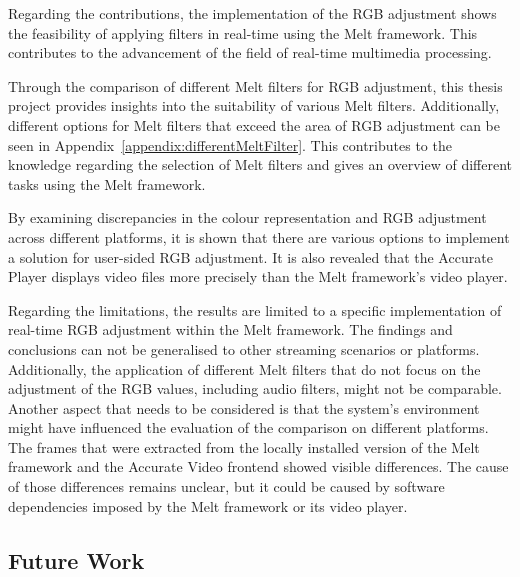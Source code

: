 \documentclass[../MasterThesis.tex]{subfiles}
\begin{document}
Regarding the contributions, the implementation of the RGB adjustment shows the feasibility of applying filters in real-time using the Melt framework.
This contributes to the advancement of the field of real-time multimedia processing.


Through the comparison of different Melt filters for RGB adjustment, this thesis project provides insights into the suitability of various Melt filters. Additionally, different options for Melt filters that exceed the area of RGB adjustment can be seen in Appendix~\ref{appendix:differentMeltFilter}.
This contributes to the knowledge regarding the selection of Melt filters and gives an overview of different tasks using the Melt framework.


By examining discrepancies in the colour representation and RGB adjustment across different platforms, it is shown that there are various options to implement a solution for user-sided RGB adjustment. It is also revealed that the Accurate Player displays video files more precisely than the Melt framework's video player.


Regarding the limitations, the results are limited to a specific implementation of real-time RGB adjustment within the Melt framework. The findings and conclusions can not be generalised to other streaming scenarios or platforms. 
Additionally, the application of different Melt filters that do not focus on the adjustment of the RGB values, including audio filters, might not be comparable. 
%
Another aspect that needs to be considered is that the system's environment might have influenced the evaluation of the comparison on different platforms. The frames that were extracted from the locally installed version of the Melt framework and the Accurate Video frontend showed visible differences. The cause of those differences remains unclear, but it could be caused by software dependencies imposed by the Melt framework or its video player.

	

	
	
	
	





\subsection{Future Work} \label{subsection:futurework}
\end{document}
